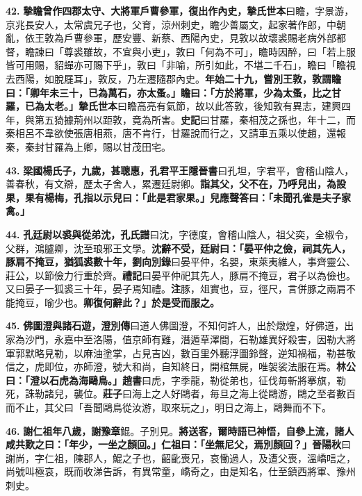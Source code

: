 \textbf{42.} \textbf{摯瞻曾作四郡太守、大將軍戶曹參軍，復出作內史，}{\footnotesize \textbf{摯氏世本}曰瞻，字景游，京兆長安人，太常虞兄子也，父育，涼州刺史，瞻少善屬文，起家著作郎，中朝亂，依王敦為戶曹參軍，歷安豐、新蔡、西陽內史，見敦以故壞裘賜老病外部都督，瞻諫曰「尊裘雖故，不宜與小吏」，敦曰「何為不可」，瞻時因醉，曰「若上服皆可用賜，貂蟬亦可賜下乎」，敦曰「非喻，所引如此，不堪二千石」，瞻曰「瞻視去西陽，如脫屣耳」，敦反，乃左遷隨郡內史。}\textbf{年始二十九，嘗別王敦，敦謂瞻曰：「卿年未三十，已為萬石，亦太蚤。」瞻曰：「方於將軍，少為太蚤，比之甘羅，已為太老。」}{\footnotesize \textbf{摯氏世本}曰瞻高亮有氣節，故以此答敦，後知敦有異志，建興四年，與第五猗據荊州以距敦，竟為所害。\textbf{史記}曰甘羅，秦相茂之孫也，年十二，而秦相呂不韋欲使張唐相燕，唐不肯行，甘羅說而行之，又請車五乘以使趙，還報秦，秦封甘羅為上卿，賜以甘茂田宅。}

\textbf{43.} \textbf{梁國楊氏子，九歲，甚聰惠，孔君平}{\footnotesize \textbf{王隱晉書}曰孔坦，字君平，會稽山陰人，善春秋，有文辯，歷太子舍人，累遷廷尉卿。}\textbf{詣其父，父不在，乃呼兒出，為設果，果有楊梅，孔指以示兒曰：「此是君家果。」兒應聲答曰：「未聞孔雀是夫子家禽。」}

\textbf{44.} \textbf{孔廷尉以裘與從弟沈，}{\footnotesize \textbf{孔氏譜}曰沈，字德度，會稽山陰人，祖父奕，全椒令，父群，鴻臚卿，沈至琅邪王文學。}\textbf{沈辭不受，廷尉曰：「晏平仲之儉，祠其先人，豚肩不掩豆，猶狐裘數十年，}{\footnotesize \textbf{劉向別錄}曰晏平仲，名嬰，東萊夷維人，事齊靈公、莊公，以節儉力行重於齊。\textbf{禮記}曰晏平仲祀其先人，豚肩不掩豆，君子以為儉也。又曰晏子一狐裘三十年，晏子焉知禮。\textbf{注}豚，俎實也，豆，徑尺，言併豚之兩肩不能掩豆，喻少也。}\textbf{卿復何辭此？」於是受而服之。}

\textbf{45.} \textbf{佛圖澄與諸石遊，}{\footnotesize \textbf{澄別傳}曰道人佛圖澄，不知何許人，出於燉煌，好佛道，出家為沙門，永嘉中至洛陽，值京師有難，潛遁草澤間，石勒雄異好殺害，因勒大將軍郭默略見勒，以麻油塗掌，占見吉凶，數百里外聽浮圖鈴聲，逆知禍福，勒甚敬信之，虎即位，亦師澄，號大和尚，自知終日，開棺無屍，唯袈裟法服在焉。}\textbf{林公曰：「澄以石虎為海鷗鳥。」}{\footnotesize \textbf{趙書}曰虎，字季龍，勒從弟也，征伐毎斬將搴旗，勒死，誅勒諸兒，襲位。\textbf{莊子}曰海上之人好鷗者，毎旦之海上從鷗游，鷗之至者數百而不止，其父曰「吾聞鷗鳥從汝游，取來玩之」，明日之海上，鷗舞而不下。}

\textbf{46.} \textbf{謝仁祖年八歲，謝豫章}{\footnotesize 鯤。子別見。}\textbf{將送客，爾時語已神悟，自參上流，諸人咸共歎之曰：「年少，一坐之顏回。」仁祖曰：「坐無尼父，焉別顏回？」}{\footnotesize \textbf{晉陽秋}曰謝尚，字仁祖，陳郡人，鯤之子也，齠齔喪兄，哀慟過人，及遭父喪，溫嶠唁之，尚號叫極哀，既而收涕告訴，有異常童，嶠奇之，由是知名，仕至鎮西將軍、豫州刺史。}

